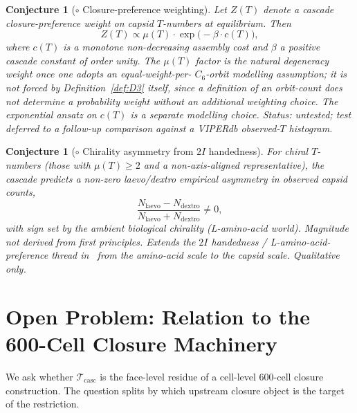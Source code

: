 \documentclass[12pt]{article}
\newtheorem{conjecture}[theorem]{Conjecture}
\newcommand{\Tcasc}{\mathcal{T}_{\mathrm{casc}}}
\begin{document}
\begin{conjecture}[$\circ$ Closure-preference weighting]\label{conj:C1}
Let $Z(T)$ denote a cascade closure-preference weight on capsid
$T$-numbers at equilibrium. Then
\[
Z(T) \propto \mu(T) \cdot \exp\!\big(-\beta \cdot c(T)\big),
\]
where $c(T)$ is a monotone non-decreasing assembly cost and $\beta$
a positive cascade constant of order unity. The $\mu(T)$ factor is
the natural degeneracy weight once one adopts an equal-weight-per-
$C_6$-orbit modelling assumption; it is not forced by
Definition~\ref{def:D3} itself, since a definition of an orbit-count
does not determine a probability weight without an additional
weighting choice. The exponential ansatz on $c(T)$ is a separate
modelling choice. Status: untested; test deferred to a follow-up
comparison against a VIPERdb observed-$T$ histogram.
\end{conjecture}

\begin{conjecture}[$\circ$ Chirality asymmetry from $2I$ handedness]\label{conj:C3}
For chiral $T$-numbers (those with $\mu(T) \ge 2$ and a
non-axis-aligned representative), the cascade predicts a non-zero
laevo/dextro empirical asymmetry in observed capsid counts,
\[
\frac{N_{\mathrm{laevo}} - N_{\mathrm{dextro}}}{N_{\mathrm{laevo}} + N_{\mathrm{dextro}}} \neq 0,
\]
with sign set by the ambient biological chirality (L-amino-acid
world). Magnitude not derived from first principles. Extends the $2I$
handedness / L-amino-acid-preference thread in~\cite[\S 2.7]{CascadeBio}
from the amino-acid scale to the capsid scale. Qualitative only.
\end{conjecture}

\section{Open Problem: Relation to the 600-Cell Closure Machinery}\label{sec:open}

We ask whether $\Tcasc$ is the face-level residue of a cell-level
600-cell closure construction. The question splits by which upstream
closure object is the target of the restriction.
\end{document}
